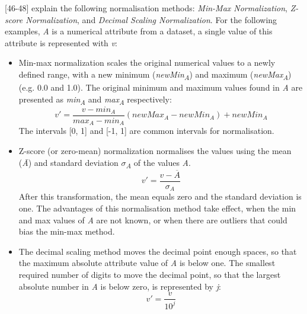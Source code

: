 \textcite{dataPreprocessingInDataMining}[46-48] explain the following normalisation methods: \textit{Min-Max Normalization}, \textit{Z-score Normalization}, and \textit{Decimal Scaling Normalization}. For the following examples, \textit{A} is a numerical attribute from a dataset, a single value of this attribute is represented with \textit{v}:
\begin{itemize}
  \item Min-max normalization scales the original numerical values to a newly defined range, with a new minimum (\textit{newMin\textsubscript{A}}) and maximum (\textit{newMax\textsubscript{A}}) (e.g. 0.0 and 1.0). The original minimum and maximum values found in \textit{A} are presented as \textit{min\textsubscript{A}} and \textit{max\textsubscript{A}} respectively:
  \[
    v' = \frac{v - min_A}{max_A - min_A}(newMax_A - newMin_A) + newMin_A
  \]
  The intervals [0, 1] and [-1, 1] are common intervals for normalisation. 

  \item Z-score (or zero-mean) normalization normalises the values using the mean (\textit{\={A}}) and standard deviation \textit{$\sigma$\textsubscript{A}} of the values \textit{A}.
  \[
    v' = \frac{v - \overline{A}}{\sigma_A}
  \]
  After this transformation, the mean equals zero and the standard deviation is one. The advantages of this normalisation method take effect, when the min and max values of \textit{A} are not known, or when there are outliers that could bias the min-max method.

  \item The decimal scaling method moves the decimal point enough spaces, so that the maximum absolute attribute value of \textit{A} is below one. The smallest required number of digits to move the decimal point, so that the largest absolute number in \textit{A} is below zero, is represented by \textit{j}:
  \[
    v' = \frac{v}{10^j}
  \]
\end{itemize}





